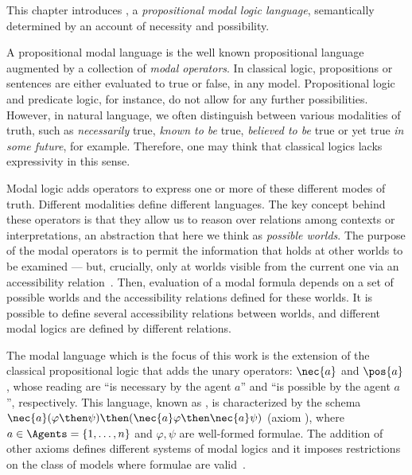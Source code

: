 This chapter introduces , a \emph{propositional modal logic
language}, semantically determined by an account of necessity and possibility.

A propositional modal language is the well known propositional language augmented
by a collection of \emph{modal operators}. In classical logic, propositions or
sentences are either evaluated to true or false, in any model. Propositional
logic and predicate logic, for instance, do not allow for any further
possibilities. However, in natural language, we often distinguish between
various modalities of truth, such as \emph{necessarily} true, \emph{known to be}
true, \emph{believed to be} true or yet true \emph{in some future}, for example.
Therefore, one may think that classical logics lacks expressivity in this sense. 

Modal logic adds operators to express one or more of these different modes of
truth. Different modalities define different languages. The key concept behind
these operators is that they allow us to reason over relations among contexts or
interpretations, an abstraction that here we think as \emph{possible worlds}.
The purpose of the modal operators is to permit the information that holds at
other worlds to be examined --- but, crucially, only at worlds visible from the
current one via an accessibility relation~\cite{blackburn2002modal}. Then,
evaluation of a modal formula depends on a set of possible worlds and the
accessibility relations defined for these worlds. It is possible to define
several accessibility relations between worlds, and different modal logics are
defined by different relations.

The modal language which is the focus of this work is the extension of the
classical propositional logic that adds the unary operators: $\nec{a}$ and
$\pos{a}$, whose reading are ``is necessary by the agent $a$'' and ``is
possible by the agent $a$'', respectively. This language, known as
, is characterized by the schema $\nec{a}(\varphi \then \psi) \then
(\nec{a} \varphi \then \nec{a} \psi)$ (axiom ), where $a \in \Agents = \{1,
\ldots, n\}$ and $\varphi, \psi$ are well-formed formulae. The addition of other
axioms defines different systems of modal logics and it imposes restrictions on
the class of models where formulae are valid~\cite{chellas:modal_logic}. 

